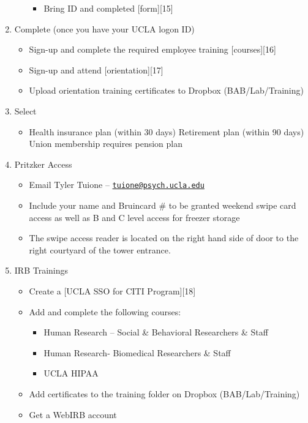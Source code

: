 \documentclass[]{book}
\providecommand{\tightlist}{%
  \setlength{\itemsep}{0pt}\setlength{\parskip}{0pt}}
\begin{document}
\begin{enumerate}
\begin{itemize}
    \begin{itemize}
    \tightlist
    \item
      Bring ID and completed {[}form{]}{[}15{]}
    \end{itemize}
  \end{itemize}
\item
  Complete (once you have your UCLA logon ID)

  \begin{itemize}
  \tightlist
  \item
    Sign-up and complete the required employee training {[}courses{]}{[}16{]}
  \item
    Sign-up and attend {[}orientation{]}{[}17{]}
  \item
    Upload orientation training certificates to Dropbox (BAB/Lab/Training)
  \end{itemize}
\item
  Select

  \begin{itemize}
  \tightlist
  \item
    Health insurance plan (within 30 days)
    Retirement plan (within 90 days)
    Union membership requires pension plan
  \end{itemize}
\item
  Pritzker Access

  \begin{itemize}
  \tightlist
  \item
    Email Tyler Tuione -- \href{mailto:tuione@psych.ucla.edu}{\nolinkurl{tuione@psych.ucla.edu}}
  \item
    Include your name and Bruincard \# to be granted weekend swipe card access as well as B and C level access for freezer storage
  \item
    The swipe access reader is located on the right hand side of door to the right courtyard of the tower entrance.
  \end{itemize}
\item
  IRB Trainings

  \begin{itemize}
  \tightlist
  \item
    Create a {[}UCLA SSO for CITI Program{]}{[}18{]}
  \item
    Add and complete the following courses:

    \begin{itemize}
    \tightlist
    \item
      Human Research -- Social \& Behavioral Researchers \& Staff
    \item
      Human Research- Biomedical Researchers \& Staff
    \item
      UCLA HIPAA
    \end{itemize}
  \item
    Add certificates to the training folder on Dropbox (BAB/Lab/Training)
  \item
    Get a WebIRB account


\end{itemize}
\end{enumerate}
\end{document}
